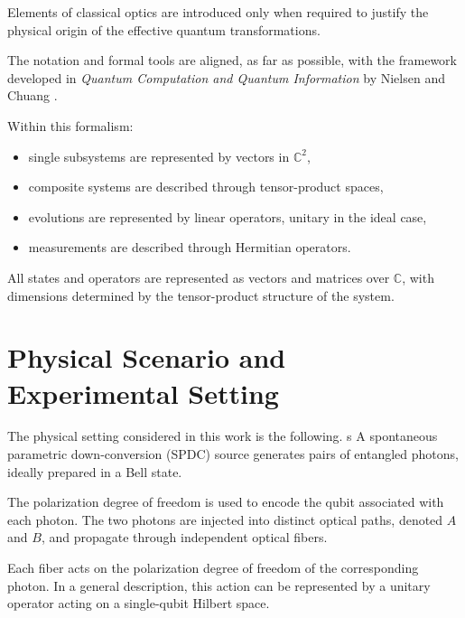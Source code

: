 Elements of classical optics are introduced only when required to justify the physical origin of the effective quantum transformations.

\medskip

The notation and formal tools are aligned, as far as possible, with the framework developed in \textit{Quantum Computation and Quantum Information} by Nielsen and Chuang \cite{nielsen_chuang_qcqi}.

\medskip

Within this formalism:

\begin{itemize}
    \item single subsystems are represented by vectors in \( \mathbb{C}^{2} \),
    \item composite systems are described through tensor-product spaces,
    \item evolutions are represented by linear operators, unitary in the ideal case,
    \item measurements are described through Hermitian operators.
\end{itemize}

\medskip

All states and operators are represented as vectors and matrices over \( \mathbb{C} \), with dimensions determined by the tensor-product structure of the system.


\section{Physical Scenario and Experimental Setting}

The physical setting considered in this work is the following.
s
A spontaneous parametric down-conversion (SPDC) source generates pairs of entangled photons, ideally prepared in a Bell state.

The polarization degree of freedom is used to encode the qubit associated with each photon. The two photons are injected into distinct optical paths, denoted \( A \) and \( B \), and propagate through independent optical fibers.

\medskip

Each fiber acts on the polarization degree of freedom of the corresponding photon. In a general description, this action can be represented by a unitary operator acting on a single-qubit Hilbert space.

